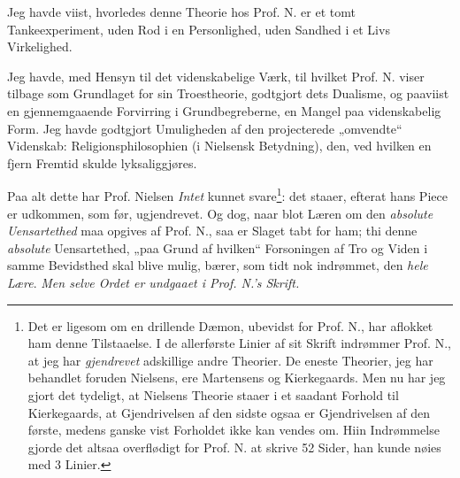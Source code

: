 \documentclass[12pt,a4paper]{book}
\newcommand{\opage}[1]{\marginnote{\footnotesize\textit{[#1]}}}
\begin{document}
Jeg havde viist, hvorledes denne Theorie hos Prof. N. er et tomt
Tankeexperiment, uden Rod i en Personlighed, uden Sandhed i et Livs Virkelighed.

Jeg havde, med Hensyn til det videnskabelige Værk, til hvilket Prof. N. viser
tilbage som Grundlaget for sin Troestheorie, godtgjort dets Dualisme, og
paaviist en gjennemgaaende Forvirring i Grundbegreberne, en Mangel paa
videnskabelig Form. Jeg havde godtgjort Umuligheden af den projecterede
„omvendte“ Videnskab: Religionsphilosophien (i Nielsensk Betydning), den, ved
hvilken en fjern Fremtid skulde lyksaliggjøres.

Paa alt dette har Prof. Nielsen \emph{Intet} kunnet svare\footnote{%
  Det er ligesom om en drillende Dæmon, ubevidst for Prof. N., har aflokket ham
  denne Tilstaaelse. I de allerførste Linier af sit Skrift indrømmer Prof. N.,
  at jeg har \emph{gjendrevet} adskillige andre Theorier. De eneste Theorier,
  jeg har behandlet foruden Nielsens, ere Martensens og Kierkegaards. Men nu har
  jeg gjort det tydeligt, at Nielsens Theorie staaer i et saadant Forhold til
  Kierkegaards, at Gjendrivelsen af den sidste ogsaa er Gjendrivelsen af den
  første, medens ganske vist Forholdet ikke kan vendes om. Hiin Indrømmelse
  gjorde det altsaa overflødigt for Prof. N. at skrive 52 Sider, han kunde nøies
  med 3 Linier.}:
\opage{5} %
\setcounter{footnote}{0}%
det staaer, efterat hans Piece er udkommen, som før, ugjendrevet. Og dog, naar
blot Læren om den \emph{absolute Uensartethed} maa opgives af Prof. N., saa er
Slaget tabt for ham; thi denne \emph{absolute} Uensartethed, „paa Grund af
hvilken“ Forsoningen af Tro og Viden i samme Bevidsthed skal blive mulig, bærer,
som tidt nok indrømmet, den \emph{hele Lære}. \emph{Men selve Ordet er undgaaet
i Prof. N.'s Skrift.}
\end{document}
